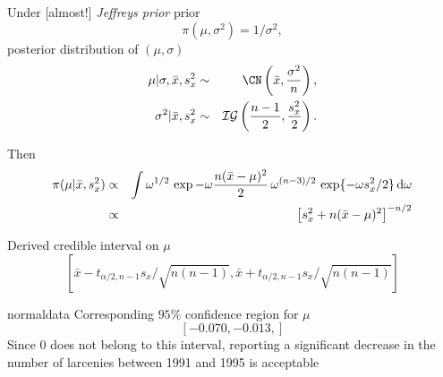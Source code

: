 \begin{slide}

Under [almost!] {\em Jeffreys prior} prior 
$$
\pi(\mu,\sigma^2)=1/\sigma^2,
$$
posterior distribution of $(\mu,\sigma)$
\small\begin{eqnarray*}
\mu|\sigma,{\bar x},s_x^2 & \sim & \CN\left({\bar x},{\sigma^2\over n}\right), \nonumber \\
\sigma^2|{\bar x},s_x^2   & \sim & {\cal IG}\left({n-1\over 2},{s_x^2\over 2}\right).
\end{eqnarray*}\normalsize

\smallskip\pause
Then
\begin{eqnarray*}\small
\pi(\mu|{\bar x},s_x^2)  & \propto & \int \omega^{1/2}\,\exp-\omega\frac{n({\bar x}-\mu)^2}{2}\,\omega^{(n-3)/2}\,\exp\{-\omega s_x^{2}/2\}\,\text{d}\omega \\
	                     & \propto & \left[ s_x^2 + n({\bar x}-\mu)^2 \right]^{-n/2}
\end{eqnarray*}\normalsize
{}

\end{slide}\begin{slide}

Derived credible interval on $\mu$
$$
[\bar x - t_{\alpha/2,n-1}s_x\big/\sqrt{n(n-1)},\bar x +t_{\alpha/2,n-1}s_x\big/\sqrt{n(n-1)}]
$$

\medskip\pause
\begin{block}{{\sf normaldata}}
Corresponding $95\%$ confidence region for $\mu$ 
$$
[-0.070,-0.013,]
$$ 
Since $0$ does not belong to this interval, reporting 
a significant decrease in the number of larcenies between 
1991 and 1995 is acceptable
\end{block}

\end{slide}
